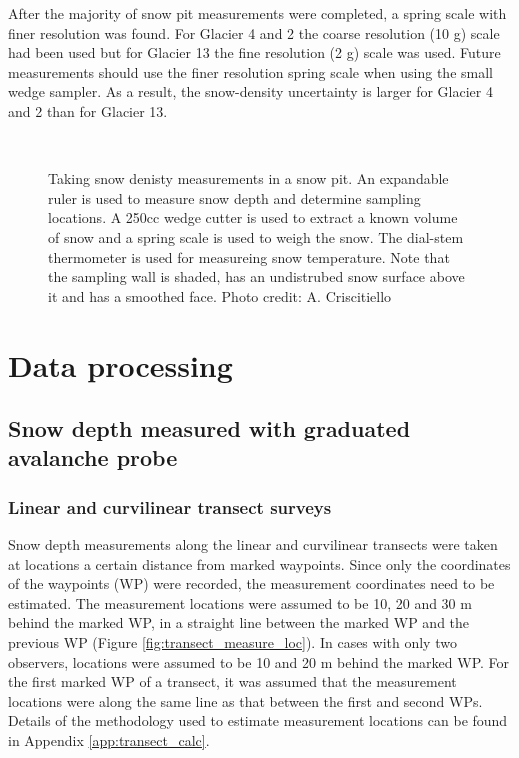 \documentclass{sfuthesis}
\begin{document}
After the majority of snow pit measurements were completed, a spring scale with finer resolution was found. For Glacier 4 and 2 the coarse resolution (10 g) scale had been used but for Glacier 13 the fine resolution (2 g) scale was used. Future measurements should use the finer resolution spring scale when using the small wedge sampler. As a result, the snow-density uncertainty is larger for Glacier 4 and 2 than for Glacier 13. 

\begin{figure}[H]
	\centering
	\\
	\caption{Taking snow denisty measurements in a snow pit. An expandable ruler is used to measure snow depth and determine sampling locations. A 250cc wedge cutter is used to extract a known volume of snow and a spring scale is used to weigh the snow. The dial-stem thermometer is used for measureing snow temperature. Note that the sampling wall is shaded, has an undistrubed snow surface above it and has a smoothed face. Photo credit: A. Criscitiello}
	\label{photo_snowpit}
	\end{figure}

\section{Data processing}
\subsection{Snow depth measured with graduated avalanche probe}

\subsubsection{Linear and curvilinear transect surveys}

Snow depth measurements along the linear and curvilinear transects were taken at locations a certain distance from marked waypoints. Since only the coordinates of the waypoints (WP) were recorded, the measurement coordinates need to be estimated. The measurement locations were assumed to be 10, 20 and 30 m behind the marked WP, in a straight line between the marked WP and the previous WP (Figure \ref{fig:transect_measure_loc}). In cases with only two observers, locations were assumed to be 10 and 20 m behind the marked WP. For the first marked WP of a transect, it was assumed that the measurement locations were along the same line as that between the first and second WPs. Details of the methodology used to estimate measurement locations can be found in Appendix \ref{app:transect_calc}.
\end{document}
